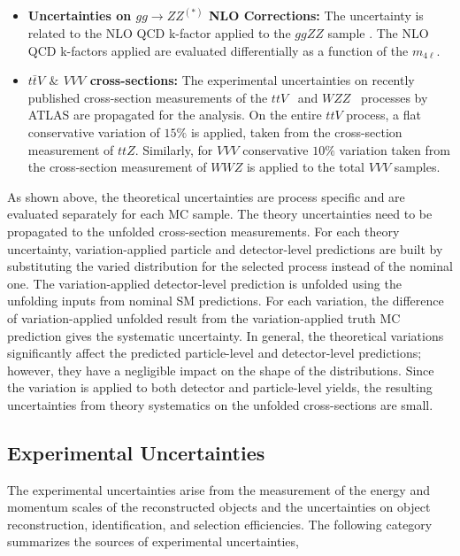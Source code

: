 \begin{itemize}
\item{\textbf{Uncertainties on $gg\rightarrow ZZ^{(\ast)}$ NLO Corrections:}
The uncertainty is related to the NLO QCD k-factor applied to the $ggZZ$ sample \cite{ggZZNLOUnc}. The NLO QCD k-factors applied are evaluated differentially as a function of the $m_{4\ell}$. 
}

\item{\textbf{$t\bar{t}V$ $\&$ $VVV$ cross-sections:}
The experimental uncertainties on recently published cross-section measurements of the $ttV$~\cite{ATLAS_ttV} and $WZZ$~\cite{ATLAS_VVV} processes by ATLAS are propagated for the analysis. On the entire $ttV$ process, a flat conservative variation of $15\%$ is applied, taken from the cross-section measurement of $ttZ$. Similarly, for $VVV$ conservative $10\%$ variation taken from the cross-section measurement of $WWZ$ is applied to the total $VVV$ samples.
}

\end{itemize}

As shown above, the theoretical uncertainties are process specific and are evaluated separately for each MC sample. The theory uncertainties need to be propagated to the unfolded cross-section measurements. For each theory uncertainty, variation-applied particle and detector-level predictions are built by substituting the varied distribution for the selected process instead of the nominal one. The variation-applied detector-level prediction is unfolded using the unfolding inputs from nominal SM predictions. For each variation, the difference of variation-applied unfolded result from the variation-applied truth MC prediction gives the systematic uncertainty. In general, the theoretical variations significantly affect the predicted particle-level and detector-level predictions; however, they have a negligible impact on the shape of the distributions. Since the variation is applied to both detector and particle-level yields, the resulting uncertainties from theory systematics on the unfolded cross-sections are small.

\subsection{Experimental Uncertainties}
\label{subsec:ExpUnc}
The experimental uncertainties arise from the measurement of the energy and momentum scales of the reconstructed objects and the uncertainties on object reconstruction, identification, and selection efficiencies. The following category summarizes the sources of experimental uncertainties,

